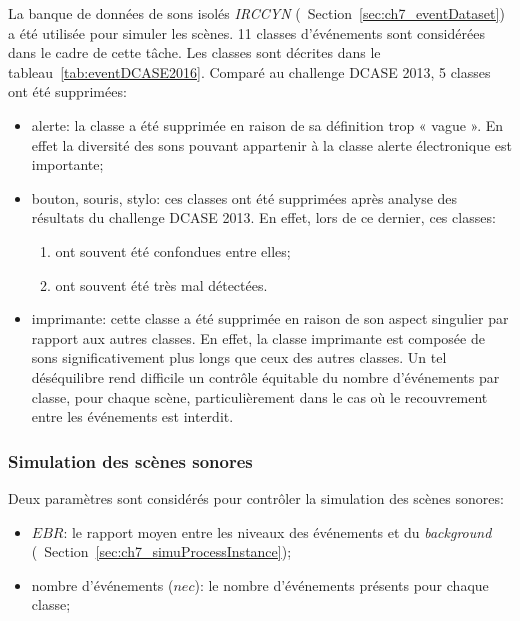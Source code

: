 La banque de données de sons isolés \emph{IRCCYN} (\cf~Section~\ref{sec:ch7_eventDataset}) a été utilisée pour simuler les scènes. 11 classes d'événements sont considérées dans le cadre de cette tâche. Les classes sont décrites dans le tableau~\ref{tab:eventDCASE2016}. Comparé au challenge DCASE 2013, 5 classes ont été supprimées:

\begin{itemize}
\item alerte: la classe a été supprimée en raison de sa définition trop « vague ». En effet la diversité des sons pouvant appartenir à la classe alerte électronique est importante;

\item bouton, souris, stylo: ces classes ont été supprimées après analyse des résultats du challenge DCASE 2013. En effet, lors de ce dernier, ces classes:

\begin{enumerate}
\item ont souvent été confondues entre elles;
\item ont souvent été très mal détectées. 
\end{enumerate}

\item imprimante: cette classe a été supprimée en raison de son aspect singulier par rapport aux autres classes. En effet, la classe imprimante est composée de sons significativement plus longs que ceux des autres classes. Un tel déséquilibre rend difficile un contrôle équitable du nombre d'événements par classe, pour chaque scène, particulièrement dans le cas où le recouvrement entre les événements est interdit.

\end{itemize}

\subsubsection{Simulation des scènes sonores}
\label{sec:ch7_simulationDcase2016}

Deux paramètres sont considérés pour contrôler la simulation des scènes sonores:

\begin{itemize}
\item $EBR$: le rapport moyen entre les niveaux des événements et du \emph{background} (\cf~Section~\ref{sec:ch7_simuProcessInstance});
\item nombre d'événements ($nec$): le nombre d'événements présents pour chaque classe;
\end{itemize}

